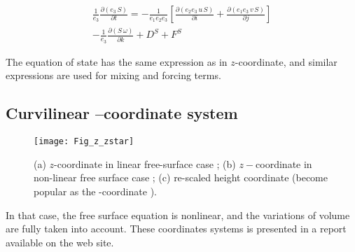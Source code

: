 \documentclass[../main/NEMO_manual]{subfiles}
\begin{document}
\begin{multline*}
  \frac{1}{e_3} \frac{\partial \left(  e_3\,S  \right) }{\partial t}=
  -\frac{1}{e_1 e_2 e_3 }\left[ {\frac{\partial \left( {e_2 e_3\,u\,S} \right)}{\partial i}
      +\frac{\partial \left( {e_1 e_3\,v\,S} \right)}{\partial j}} \right]    \\
  -\frac{1}{e_3 }\frac{\partial \left( {S\,\omega } \right)}{\partial k}     + D^S + F^S   \qquad
\end{multline*}

The equation of state has the same expression as in $z$-coordinate,
and similar expressions are used for mixing and forcing terms.




\subsection{Curvilinear \zstar--coordinate system}
\label{subsec:PE_zco_star}

\begin{figure}[!b]
  \begin{center}
    \texttt{[image: Fig\_z\_zstar]}
    \caption{	\protect\label{fig:z_zstar}
      (a) $z$-coordinate in linear free-surface case ;
      (b) $z-$coordinate in non-linear free surface case ;
      (c) re-scaled height coordinate (become popular as the \zstar-coordinate
      \citep{Adcroft_Campin_OM04} ).
    }
  \end{center}
\end{figure}


In that case, the free surface equation is nonlinear, and the variations of volume are fully taken into account.
These coordinates systems is presented in a report \citep{Levier2007} available on the \NEMO web site. 
\end{document}

